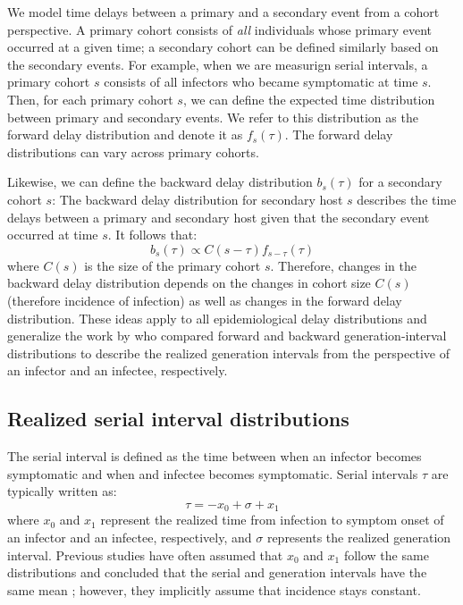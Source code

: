 \documentclass[12pt]{article}
\begin{document}
We model time delays between a primary and a secondary event from a cohort perspective.
A primary cohort consists of \emph{all} individuals whose primary event occurred at a given time; 
a secondary cohort can be defined similarly based on the secondary events.
For example, when we are measurign serial intervals, a primary cohort $s$ consists of all infectors who became symptomatic at time $s$.
Then, for each primary cohort $s$, we can define the expected time distribution between primary and secondary events.
We refer to this distribution as the forward delay distribution and denote it as $f_s(\tau)$.
The forward delay distributions can vary across primary cohorts.

Likewise, we can define the backward delay distribution $b_s(\tau)$ for a secondary cohort $s$:
The backward delay distribution for secondary host $s$ describes the time delays between a primary and secondary host given that the secondary event occurred at time $s$.
It follows that:
\begin{equation}
b_s(\tau) \propto C(s-\tau) f_{s-\tau}(\tau)
\end{equation}
where $C(s)$ is the size of the primary cohort $s$.
Therefore, changes in the backward delay distribution depends on the changes in cohort size $C(s)$ (therefore incidence of infection) as well as changes in the forward delay distribution.
These ideas apply to all epidemiological delay distributions and generalize the work by \citep{champredon2015intrinsic} who compared forward and backward generation-interval distributions to describe the realized generation intervals from the perspective of an infector and an infectee, respectively.

\subsection{Realized serial interval distributions}

The serial interval is defined as the time between when an infector becomes symptomatic and when and infectee becomes symptomatic.
Serial intervals $\tau$ are typically written as:
\begin{equation}
\tau = - x_0 + \sigma + x_1
\end{equation}
where $x_0$ and $x_1$ represent the realized time from infection to symptom onset of an infector and an infectee, respectively, and $\sigma$ represents the realized generation interval.
Previous studies have often assumed that $x_0$ and $x_1$ follow the same distributions and concluded that the serial and generation intervals have the same mean \citep{svensson2007note,klinkenberg2011correlation,champredon2018equivalence, britton2019estimation};
however, they implicitly assume that incidence stays constant.
\end{document}
